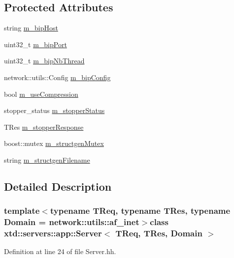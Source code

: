 \subsection*{Protected Attributes}
\begin{DoxyCompactItemize}
\item 
string \hyperlink{classxtd_1_1servers_1_1app_1_1Server_a08752041a6fc98289ad93c93c1d4fd75}{m\-\_\-bip\-Host}
\item 
uint32\-\_\-t \hyperlink{classxtd_1_1servers_1_1app_1_1Server_a849adda20d929ad1116564177986e146}{m\-\_\-bip\-Port}
\item 
uint32\-\_\-t \hyperlink{classxtd_1_1servers_1_1app_1_1Server_a4e7cb3d792a27b1572aa775f8f0018f3}{m\-\_\-bip\-Nb\-Thread}
\item 
network\-::utils\-::\-Config \hyperlink{classxtd_1_1servers_1_1app_1_1Server_a62a3f48e47eba551b53d0bef859aa906}{m\-\_\-bip\-Config}
\item 
bool \hyperlink{classxtd_1_1servers_1_1app_1_1Server_a143d0eeee15dd57ba4d03737a0128551}{m\-\_\-use\-Compression}
\item 
stopper\-\_\-status \hyperlink{classxtd_1_1servers_1_1app_1_1Server_ae5180a630e0f23596a0909f845d00e69}{m\-\_\-stopper\-Status}
\item 
T\-Res \hyperlink{classxtd_1_1servers_1_1app_1_1Server_afb80e8da001aafc8ffbf5b2dd8a9213e}{m\-\_\-stopper\-Response}
\item 
boost\-::mutex \hyperlink{classxtd_1_1servers_1_1app_1_1Server_a3ad929be560e47d7193da946cd74e557}{m\-\_\-structgen\-Mutex}
\item 
string \hyperlink{classxtd_1_1servers_1_1app_1_1Server_a66a9242f7a55a296f1ca25cb18764eec}{m\-\_\-structgen\-Filename}
\end{DoxyCompactItemize}


\subsection{Detailed Description}
\subsubsection*{template$<$typename T\-Req, typename T\-Res, typename Domain = network\-::utils\-::af\-\_\-inet$>$class xtd\-::servers\-::app\-::\-Server$<$ T\-Req, T\-Res, Domain $>$}



Definition at line 24 of file Server.\-hh.



